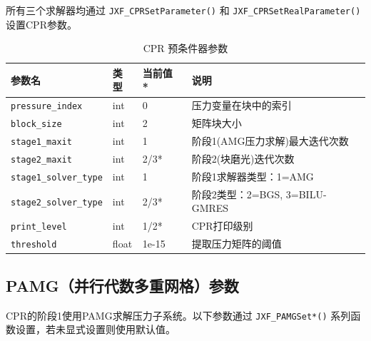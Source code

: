 \documentclass[12pt,a4paper]{article}
\begin{document}
所有三个求解器均通过 \texttt{JXF\_CPRSetParameter()} 和 \texttt{JXF\_CPRSetRealParameter()} 设置CPR参数。

\begin{table}[htbp]
\centering
\caption{CPR 预条件器参数}
\label{tab:params_cpr}
\begin{tabular}{llll}
\toprule
参数名 & 类型 & 当前值 * & 说明 \\
\midrule
\texttt{pressure\_index} & int & 0 & 压力变量在块中的索引 \\
\texttt{block\_size} & int & 2 & 矩阵块大小 \\
\texttt{stage1\_maxit} & int & 1 & 阶段1(AMG压力求解)最大迭代次数 \\
\texttt{stage2\_maxit} & int & 2/3* & 阶段2(块磨光)迭代次数 \\
\texttt{stage1\_solver\_type} & int & 1 & 阶段1求解器类型：1=AMG \\
\texttt{stage2\_solver\_type} & int & 2/3* & 阶段2类型：2=BGS, 3=BILU-GMRES \\
\texttt{print\_level} & int & 1/2* & CPR打印级别 \\
\texttt{threshold} & float & 1e-15 & 提取压力矩阵的阈值 \\
\bottomrule
\end{tabular}
\end{table}

\subsection{PAMG（并行代数多重网格）参数}

CPR的阶段1使用PAMG求解压力子系统。以下参数通过 \texttt{JXF\_PAMGSet*()} 系列函数设置，若未显式设置则使用默认值。
\end{document}
